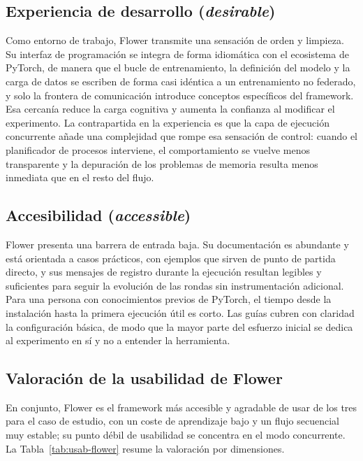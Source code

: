 \subsection{Experiencia de desarrollo (\textit{desirable})}\label{sec:usab-flower-desirable}

Como entorno de trabajo, Flower transmite una sensación de orden y limpieza. Su interfaz de
programación se integra de forma idiomática con el ecosistema de PyTorch, de manera que el
bucle de entrenamiento, la definición del modelo y la carga de datos se escriben de forma
casi idéntica a un entrenamiento no federado, y solo la frontera de comunicación introduce
conceptos específicos del framework. Esa cercanía reduce la carga cognitiva y aumenta la
confianza al modificar el experimento. La contrapartida en la experiencia es que la capa de
ejecución concurrente añade una complejidad que rompe esa sensación de control: cuando el
planificador de procesos interviene, el comportamiento se vuelve menos transparente y la
depuración de los problemas de memoria resulta menos inmediata que en el resto del flujo.

\subsection{Accesibilidad (\textit{accessible})}\label{sec:usab-flower-accessible}

Flower presenta una barrera de entrada baja. Su documentación es abundante y está orientada
a casos prácticos, con ejemplos que sirven de punto de partida directo, y sus mensajes de
registro durante la ejecución resultan legibles y suficientes para seguir la evolución de las
rondas sin instrumentación adicional. Para una persona con conocimientos previos de PyTorch,
el tiempo desde la instalación hasta la primera ejecución útil es corto. Las guías cubren con
claridad la configuración básica, de modo que la mayor parte del esfuerzo inicial se dedica al
experimento en sí y no a entender la herramienta.

\subsection{Valoración de la usabilidad de Flower}\label{sec:usab-flower-valoracion}

En conjunto, Flower es el framework más accesible y agradable de usar de los tres para el
caso de estudio, con un coste de aprendizaje bajo y un flujo secuencial muy estable; su
punto débil de usabilidad se concentra en el modo concurrente. La
Tabla~\ref{tab:usab-flower} resume la valoración por dimensiones.

